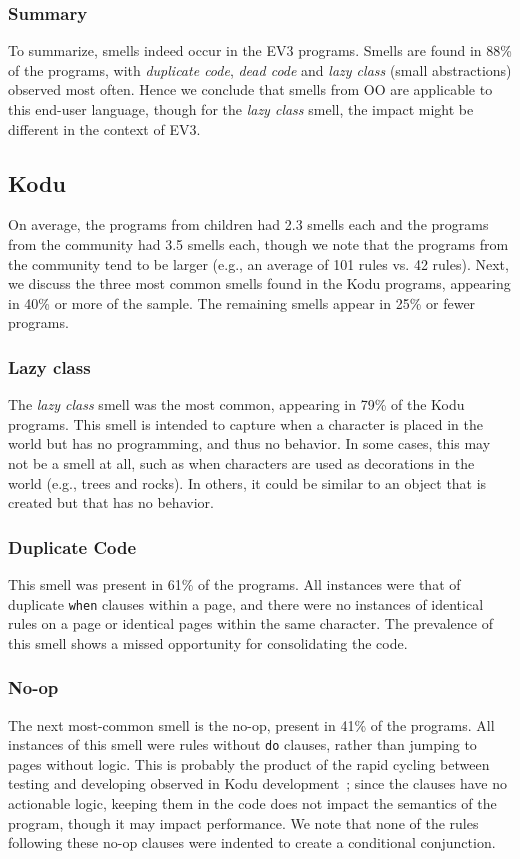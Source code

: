 \documentclass[conference]{IEEEtran}
\begin{document}
\subsubsection{Summary}
To summarize, smells indeed occur in the EV3 programs. Smells are found in 88\% of the programs, with \emph{duplicate code}, \emph{dead code} and \emph{lazy class} (small abstractions) observed most often. Hence we conclude that smells from OO are applicable to this end-user language, though for the \emph{lazy class} smell, the impact might be different in the context of EV3. 


\subsection{Kodu}
On average, the programs from children had 2.3 smells each and the programs from the community had 3.5 smells each, though we note that the programs from the community tend to be larger (e.g., an average of 101 rules vs. 42 rules). Next, we discuss the three most common smells found in the Kodu programs, appearing in 40\% or more of the sample. The remaining smells appear in 25\% or fewer programs. 

\subsubsection{Lazy class}
The \emph{lazy class} smell was the most common, appearing in 79\% of the Kodu programs. This smell is intended to capture when a character is placed in the world but has no programming, and thus no behavior. In some cases, this may not be a smell at all, such as when characters are used as decorations in the world (e.g., trees and rocks). In others, it could be similar to an object that is created but that has no behavior. 

\subsubsection{Duplicate Code}
This smell was present in 61\% of the programs. All instances were that of duplicate {\tt when} clauses within a page, and there were no instances of identical rules on a page or identical pages within the same character. The prevalence of this smell shows a missed opportunity for consolidating the code. 

\subsubsection{No-op}
The next most-common smell is the no-op, present in 41\% of the programs. All instances of this smell were rules without {\tt do} clauses, rather than jumping to pages without logic.  This is probably the product of the rapid cycling between testing and developing observed in Kodu development~\cite{Stolee:2011:ECS:1953163.1953197}; since the clauses have no actionable logic, keeping them in the code does not impact the semantics of the program, though it may impact performance. We note that none of the rules following these no-op clauses were indented to create a conditional conjunction. 
\end{document}
